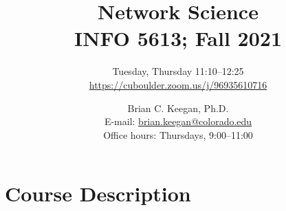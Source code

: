 \documentclass[11pt]{memoir}
\makeatletter
\def\myauthor{Brian C. Keegan, Ph.D.}
\def\mycoursename{Network Science}
\def\mycourselisting{INFO 5613}
\def\myoffice{INFO 129}
\def\myclassroom{\href{https://cuboulder.zoom.us/j/96935610716}{https://cuboulder.zoom.us/j/96935610716}}
\def\mymeetingtime{Tuesday, Thursday 11:10--12:25}
\def\mydate{Fall 2021}
\def\myemail{brian.keegan@colorado.edu}
\def\myofficehours{Thursdays, 9:00--11:00}
\makeatother
\begin{document}
\nobibliography*


\title{
    \textbf{\huge{\mycoursename}}\\
    \vspace{5pt} \normalsize{\mycourselisting}; \mydate
    }

\author{
\mymeetingtime\\
\myclassroom\\
}

\date{\normalsize{\myauthor\\
       E-mail: \href{mailto:\myemail}{\myemail}\\
       Office hours: \myofficehours}}

\maketitle




\section{\textbf{Course Description}}

\end{document}
